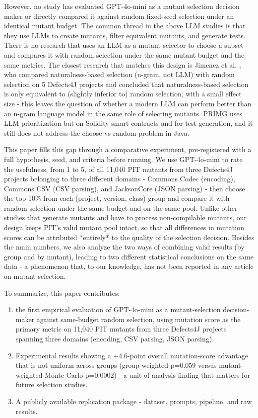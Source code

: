 However, no study has evaluated GPT-4o-mini as a mutant selection decision maker or directly compared it against random fixed-seed selection under an identical mutant budget. The common thread in the above LLM studies is that they use LLMs to create mutants, filter equivalent mutants, and generate tests. There is no research that uses an LLM as a mutant selector to choose a subset and compares it with random selection under the same mutant budget and the same metrics. The closest research that matches this design is Jimenez et al. \cite{jimenez2018naturalness}, who compared naturalness-based selection (n-gram, not LLM) with random selection on 5 Defects4J projects and concluded that naturalness-based selection is only equivalent to (slightly inferior to) random selection, with a small effect size - this leaves the question of whether a modern LLM can perform better than an n-gram language model in the same role of selecting mutants. PRIMG \cite{bouafif2025primg} uses LLM prioritization but on Solidity smart contracts and for test generation, and it still does not address the choose-vs-random problem in Java.

This paper fills this gap through a comparative experiment, pre-registered with a full hypothesis, seed, and criteria before running. We use GPT-4o-mini to rate the usefulness, from 1 to 5, of all 11,040 PIT mutants from three Defects4J projects belonging to three different domains - Commons Codec (encoding), Commons CSV (CSV parsing), and JacksonCore (JSON parsing) - then choose the top 10\% from each (project, version, class) group and compare it with random selection under the same budget and on the same pool. Unlike other studies that generate mutants and have to process non-compilable mutants, our design keeps PIT's valid mutant pool intact, so that all differences in mutation scores can be attributed *entirely* to the quality of the selection decision. Besides the main numbers, we also analyze the two ways of combining valid results (by group and by mutant), leading to two different statistical conclusions on the same data - a phenomenon that, to our knowledge, has not been reported in any article on mutant selection.

To summarize, this paper contributes:
\begin{enumerate}
\item the first empirical evaluation of GPT-4o-mini as a mutant-selection decision-maker against same-budget random selection, using mutation score as the primary metric on 11,040 PIT mutants from three Defects4J projects spanning three domains (encoding, CSV parsing, JSON parsing).
\item Experimental results showing a +4.6-point overall mutation-score advantage that is not uniform across groups (group-weighted p=0.059 versus mutant-weighted Monte-Carlo p=0.0002) - a unit-of-analysis finding that matters for future selection studies.
\item A publicly available replication package - dataset, prompts, pipeline, and raw results.
\end{enumerate}

